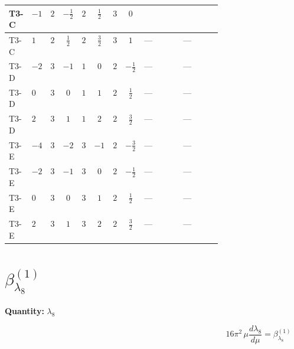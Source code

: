 \documentclass[8pt]{article}
\begin{document}
\begin{landscape}
\begin{longtable}{@{}llcccccc >{\raggedright\arraybackslash}p{0.21\linewidth} >{\raggedright\arraybackslash}p{0.21\linewidth}@{}}
\midrule
T3-C & $-1$ & $2$ & $-\frac{1}{2}$ & $2$ & $\frac{1}{2}$ & $3$ & $0$ & \scriptsize\adjustbox{max width=\linewidth}{$\begin{gathered} -6 {\lambda_{7}} {\lambda_5}\end{gathered}$} & \scriptsize\adjustbox{max width=\linewidth}{$\begin{gathered} +{\lambda_{H H^\dagger S_1^\dagger S_2^\dagger}^{\rm Cross}} \left(\frac{3}{2} T_{\nu}^{(1)}+\frac{3}{2} T_{\nu}^{(2)}+6 \operatorname{Tr}\!\left({Y_d}\,\left({Y_d}\right)^{\dagger}\right)+2 \operatorname{Tr}\!\left({Y_e}\,\left({Y_e}\right)^{\dagger}\right)+6 \operatorname{Tr}\!\left({Y_u}\,\left({Y_u}\right)^{\dagger}\right)\right)\end{gathered}$} \\
\midrule
T3-C & $1$ & $2$ & $\frac{1}{2}$ & $2$ & $\frac{3}{2}$ & $3$ & $1$ & --- & --- \\
\midrule
T3-D & $-2$ & $3$ & $-1$ & $1$ & $0$ & $2$ & $-\frac{1}{2}$ & --- & --- \\
\midrule
T3-D & $0$ & $3$ & $0$ & $1$ & $1$ & $2$ & $\frac{1}{2}$ & --- & --- \\
\midrule
T3-D & $2$ & $3$ & $1$ & $1$ & $2$ & $2$ & $\frac{3}{2}$ & --- & --- \\
\midrule
T3-E & $-4$ & $3$ & $-2$ & $3$ & $-1$ & $2$ & $-\frac{3}{2}$ & --- & --- \\
\midrule
T3-E & $-2$ & $3$ & $-1$ & $3$ & $0$ & $2$ & $-\frac{1}{2}$ & --- & --- \\
\midrule
T3-E & $0$ & $3$ & $0$ & $3$ & $1$ & $2$ & $\frac{1}{2}$ & --- & --- \\
\midrule
T3-E & $2$ & $3$ & $1$ & $3$ & $2$ & $2$ & $\frac{3}{2}$ & --- & --- \\
\midrule
\bottomrule
\end{longtable}
\clearpage
\section*{$\beta_{\lambda_{8}}^{(1)}$}
\noindent\textbf{Quantity: }$\lambda_{8}$\par\smallskip
\[16\pi^2\,\mu\frac{d \lambda_{8}}{d\mu}=\beta_{\lambda_{8}}^{(1)}\]

\end{landscape}
\end{document}
